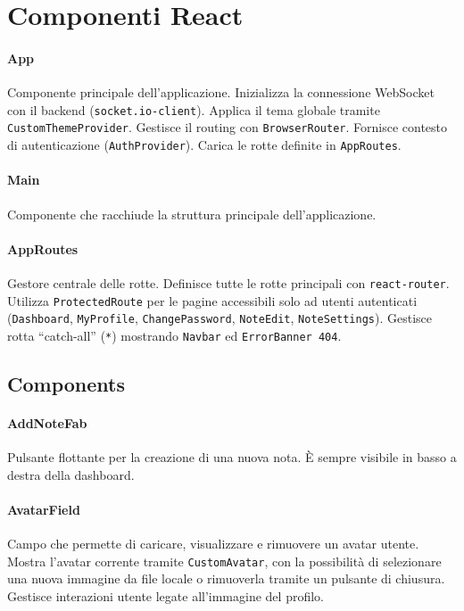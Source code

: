 \documentclass[11pt]{article}
\begin{document}
\newpage
\section{Componenti React}

\paragraph{App}  
Componente principale dell’applicazione. Inizializza la connessione WebSocket con il backend (\texttt{socket.io-client}). Applica il tema globale tramite \texttt{CustomThemeProvider}.  Gestisce il routing con \texttt{BrowserRouter}.  Fornisce contesto di autenticazione (\texttt{AuthProvider}).  Carica le rotte definite in \texttt{AppRoutes}.

\paragraph{Main}
Componente che racchiude la struttura principale dell’applicazione.

\paragraph{AppRoutes}  
Gestore centrale delle rotte. Definisce tutte le rotte principali con \texttt{react-router}. Utilizza \texttt{ProtectedRoute} per le pagine accessibili solo ad utenti autenticati (\texttt{Dashboard}, \texttt{MyProfile}, \texttt{ChangePassword}, \texttt{NoteEdit}, \texttt{NoteSettings}). Gestisce rotta “catch-all” (\texttt{*}) mostrando \texttt{Navbar} ed \texttt{ErrorBanner 404}.

\subsection{Components}

\paragraph{AddNoteFab} 
Pulsante flottante per la creazione di una nuova nota. 
È sempre visibile in basso a destra della dashboard.

\paragraph{AvatarField} 
Campo che permette di caricare, visualizzare e rimuovere un avatar utente. 
Mostra l’avatar corrente tramite \texttt{CustomAvatar}, con la possibilità di selezionare una nuova immagine da file locale o rimuoverla tramite un pulsante di chiusura. 
Gestisce interazioni utente legate all’immagine del profilo.
\end{document}
